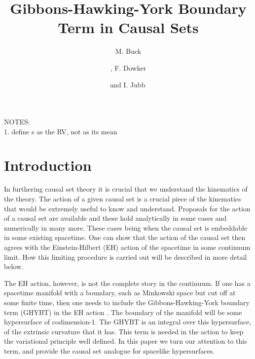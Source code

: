 \documentclass[12pt]{article}
\title{Gibbons-Hawking-York Boundary Term in Causal Sets}
\author[a]{M. Buck}
\author[a,b]{\!, F. Dowker}
\author[a]{and I. Jubb\,}
\affiliation[a]{Theoretical Physics Group, Blackett Laboratory, Imperial College, London, SW7 2AZ, U.K.}
\affiliation[b]{Institute for Quantum Computing, University of Waterloo, ON, N2L 2Y5, Canada}
\begin{document}
\maketitle


\noindent NOTES:\\
1. define s as the RV, not as its mean

\section{Introduction}


In furthering causal set theory it is crucial that we understand the kinematics of the theory. The action of a given causal set is a crucial piece of the kinematics that would be extremely useful to know and understand. Proposals for the action of a causal set are available \cite{Benincasa_Dowker:The_Scalar_Curvature_of_a_Causal_Set} and these hold analytically in some cases and numerically in many more. These cases being when the causal set is embeddable in some existing spacetime. One can show that the action of the causal set then agrees with the Einstein-Hilbert (EH) action of the spacetime in some continuum limit. How this limiting procedure is carried out will be described in more detail below.

The EH action, however, is not the complete story in the continuum. If one has a spacetime manifold with a boundary, such as Minkowski space but cut off at some finite time, then one needs to include the Gibbons-Hawking-York boundary term (GHYBT) in the EH action \cite{Gibbons_Hawking_Boundary}. The boundary of the manifold will be some hypersurface of codimension-1. The GHYBT is an integral over this hypersurface, of the extrinsic curvature that it has. This term is needed in the action to keep the variational principle well defined. In this paper we turn our attention to this term, and provide the causal set analogue for spacelike hypersurfaces.
\end{document}
